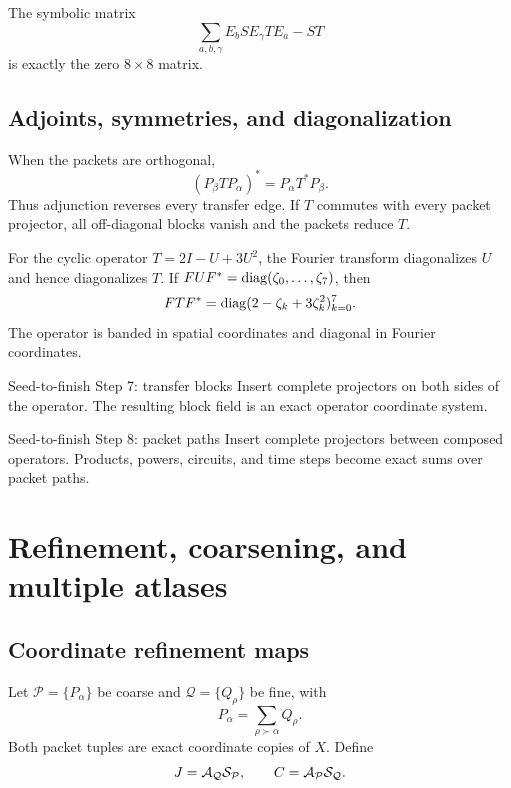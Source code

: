 
\begin{certificate}
The symbolic matrix
\[
\sum_{a,b,\gamma}
E_bSE_\gamma TE_a-ST
\]
is exactly the zero $8\times8$ matrix.
\end{certificate}

\section{Adjoints, symmetries, and diagonalization}
When the packets are orthogonal,
\[
(P_\beta TP_\alpha)^*=P_\alpha T^*P_\beta.
\]
Thus adjunction reverses every transfer edge.  If $T$ commutes with every packet projector, all off-diagonal blocks vanish and the packets reduce $T$.

For the cyclic operator $T=2I-U+3U^2$, the Fourier transform diagonalizes $U$ and hence diagonalizes $T$.  If $FUF^*=\operatorname{diag}(\zeta_0,\ldots,\zeta_7)$, then
\[
FTF^*
=
\operatorname{diag}(2-\zeta_k+3\zeta_k^2)_{k=0}^{7}.
\]
The operator is banded in spatial coordinates and diagonal in Fourier coordinates.


\begin{stepbox}{Seed-to-finish Step 7: transfer blocks}
Insert complete projectors on both sides of the operator.  The resulting block field is an exact operator coordinate system.
\end{stepbox}

\begin{stepbox}{Seed-to-finish Step 8: packet paths}
Insert complete projectors between composed operators.  Products, powers, circuits, and time steps become exact sums over packet paths.
\end{stepbox}

\chapter{Refinement, coarsening, and multiple atlases}\label{ch:refinement-atlases}

\section{Coordinate refinement maps}
Let $\mathcal P=\{P_\alpha\}$ be coarse and $\mathcal Q=\{Q_\rho\}$ be fine, with
\[
P_\alpha=\sum_{\rho\succ\alpha}Q_\rho.
\]
Both packet tuples are exact coordinate copies of $X$.  Define
\[
J=\mathcal A_{\mathcal Q}\mathcal S_{\mathcal P},
\qquad
C=\mathcal A_{\mathcal P}\mathcal S_{\mathcal Q}.
\]

